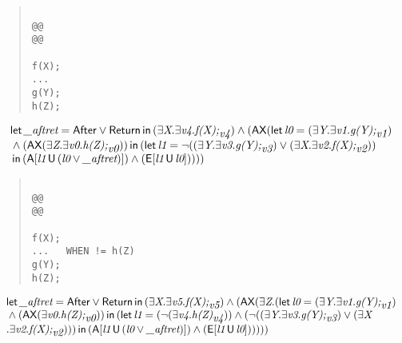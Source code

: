 \documentclass{article}
\newcommand{\U}{\,\mbox{\sf{U}}\,}
\newcommand{\A}{\mbox{\sf{A}}}
\newcommand{\E}{\mbox{\sf{E}}}
\newcommand{\AX}{\mbox{\sf{AX}}}
\newcommand{\mita}[1]{\mbox{\it{{#1}}}}
\newcommand{\msf}[1]{\mbox{\sf{{#1}}}}
\begin{document}
\begin{quote}\begin{verbatim}

@@
@@

f(X);
...
g(Y);
h(Z);
\end{verbatim}\end{quote}

\[\begin{array}{l}
\mita{\sf{let}} \, \mita{\_aftret} = \msf{After} \vee \msf{Return} \, \mita{\sf{in}} \, (\exists \mita{X} . \exists \mita{v4} . \mita{f(X);}_{\mita{v4}}) \wedge (\AX(\mita{\sf{let}} \, \mita{l0} = (\exists \mita{Y} . \exists \mita{v1} . \mita{g(Y);}_{\mita{v1}})\\\mbox{} \wedge (\AX(\exists \mita{Z} . \exists \mita{v0} . \mita{h(Z);}_{\mita{v0}})) \, \mita{\sf{in}} \, (\mita{\sf{let}} \, \mita{l1} = \neg ((\exists \mita{Y} . \exists \mita{v3} . \mita{g(Y);}_{\mita{v3}}) \vee (\exists \mita{X} . \exists \mita{v2} . \mita{f(X);}_{\mita{v2}}))\\\mbox{} \, \mita{\sf{in}} \, (\A[\mita{l1} \U (\mita{l0} \vee \mita{\_aftret})]
) \wedge (\E[\mita{l1} \U \mita{l0}]
)
)
))

\end{array}\]

\begin{quote}\begin{verbatim}

@@
@@

f(X);
...   WHEN != h(Z)
g(Y);
h(Z);
\end{verbatim}\end{quote}

\[\begin{array}{l}
\mita{\sf{let}} \, \mita{\_aftret} = \msf{After} \vee \msf{Return} \, \mita{\sf{in}} \, (\exists \mita{X} . \exists \mita{v5} . \mita{f(X);}_{\mita{v5}}) \wedge (\AX(\exists \mita{Z} . (\mita{\sf{let}} \, \mita{l0} = (\exists \mita{Y} . \exists \mita{v1} . \mita{g(Y);}_{\mita{v1}})\\\mbox{} \wedge (\AX(\exists \mita{v0} . \mita{h(Z);}_{\mita{v0}})) \, \mita{\sf{in}} \, (\mita{\sf{let}} \, \mita{l1} = (\neg (\exists \mita{v4} . \mita{h(Z)}_{\mita{v4}})) \wedge (\neg ((\exists \mita{Y} . \exists \mita{v3} . \mita{g(Y);}_{\mita{v3}}) \vee (\exists \mita{X}\\\mbox{} . \exists \mita{v2} . \mita{f(X);}_{\mita{v2}}))) \, \mita{\sf{in}} \, (\A[\mita{l1} \U (\mita{l0} \vee \mita{\_aftret})]
) \wedge (\E[\mita{l1} \U \mita{l0}]
)
)
)))

\end{array}\]
\end{document}
